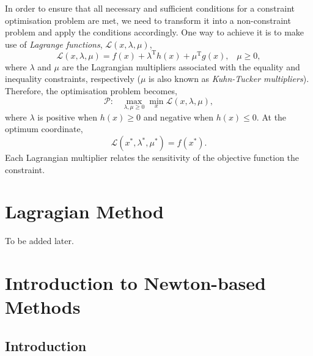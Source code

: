 In order to ensure that all necessary and sufficient conditions for a constraint optimisation problem are met, we need to transform it into a non-constraint problem and apply the conditions accordingly. One way to achieve it is to make use of {\it Lagrange functions}, $\mathcal{L}\left(x,\lambda,\mu\right)$,
    \begin{displaymath}   
       \mathcal{L}\left(x,\lambda,\mu\right) = f(x) + \lambda^{\text{T}}h(x) + \mu^{\text{T}}g(x),\;\;\;\mu\ge 0,
    \end{displaymath}
where $\lambda$ and $\mu$ are the Lagrangian multipliers associated with the equality and inequality constraints, respectively ($\mu$ is also known as {\it Kuhn-Tucker multipliers}). Therefore, the optimisation problem becomes,
    \begin{displaymath}
       \mathcal{P}:\;\;\;\max_{\lambda,\mu\ge 0} \min_{x} \mathcal{L}\left(x,\lambda,\mu\right),
    \end{displaymath} 
where $\lambda$ is positive when $h(x)\ge 0$ and negative when $h(x)\le 0$. At the optimum coordinate,
    \begin{displaymath}
       \mathcal{L}\left(x^{\ast}, \lambda^{\ast},\mu^{\ast}\right) = f\left(x^{\ast}\right).
    \end{displaymath}
Each Lagrangian multiplier relates the sensitivity of the objective function \wrt the constraint.


\section{Lagragian Method}
To be added later.





\section{Introduction to Newton-based Methods}\label{Chapter:GlobalOpt:Section:NewtonMethods}

\subsection{Introduction}\label{Chapter:GlobalOpt:Section:NewtonMethods:Intro}

